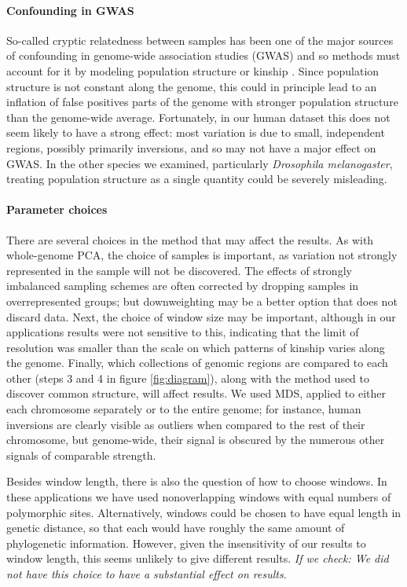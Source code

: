 \documentclass[11pt, oneside]{article}   	%
\newcommand{\plr}[1]{{\em \color{blue} #1}}
\begin{document}
\paragraph{Confounding in GWAS}
So-called cryptic relatedness between samples
has been one of the major sources of confounding in genome-wide association studies (GWAS)
and so methods must account for it by modeling population structure or kinship \citep{gwas_confounding_review,mixed_models}.
Since population structure is not constant along the genome,
this could in principle lead to an inflation of false positives parts of the genome
with stronger population structure than the genome-wide average.
Fortunately, in our human dataset this does not seem likely to have a strong effect:
most variation is due to small, independent regions, possibly primarily inversions,
and so may not have a major effect on GWAS.
In the other species we examined, particularly \textit{Drosophila melanogaster},
treating population structure as a single quantity could be severely misleading.


\paragraph{Parameter choices}
There are several choices in the method that may affect the results.
As with whole-genome PCA,
the choice of samples is important,
as variation not strongly represented in the sample will not be discovered.
The effects of strongly imbalanced sampling schemes are often corrected by dropping samples in overrepresented groups;
but downweighting may be a better option that does not discard data.
Next, the choice of window size may be important,
although in our applications results were not sensitive to this,
indicating that the limit of resolution was smaller than the scale on which patterns of kinship varies along the genome.
Finally, which collections of genomic regions are compared to each other (steps 3 and 4 in figure \ref{fig:diagram}),
along with the method used to discover common structure,
will affect results.
We used MDS, applied to either each chromosome separately or to the entire genome;
for instance, human inversions are clearly visible as outliers when compared to the rest of their chromosome,
but genome-wide, their signal is obscured by the numerous other signals of comparable strength.

Besides window length, there is also the question of how to choose windows.
In these applications we have used nonoverlapping windows with equal numbers of polymorphic sites.
Alternatively, windows could be chosen to have equal length in genetic distance,
so that each would have roughly the same amount of phylogenetic information.
However, given the insensitivity of our results to window length,
this seems unlikely to give different results.
\plr{If we check: We did not have this choice to have a substantial effect on results.}
\end{document}
